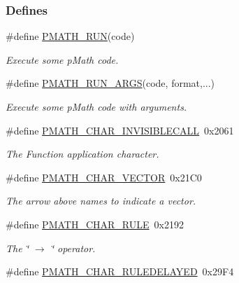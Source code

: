 \subsubsection*{Defines}
\begin{CompactItemize}
\item 
\#define \hyperlink{group__parser_gf8ba5467c4b9e3e32ad0a8606466cb83}{PMATH\_\-RUN}(code)
\begin{CompactList}\small\item\em Execute some pMath code. \item\end{CompactList}\item 
\#define \hyperlink{group__parser_g34e88a07b31df0c7556eb9181dfaca31}{PMATH\_\-RUN\_\-ARGS}(code, format,...)
\begin{CompactList}\small\item\em Execute some pMath code with arguments. \item\end{CompactList}\item 
\hypertarget{group__parser_gc196223b7e2a8e3bd40edb74d6a89ff5}{
\#define \hyperlink{group__parser_gc196223b7e2a8e3bd40edb74d6a89ff5}{PMATH\_\-CHAR\_\-INVISIBLECALL}~0x2061}
\label{group__parser_gc196223b7e2a8e3bd40edb74d6a89ff5}

\begin{CompactList}\small\item\em The Function application character. \item\end{CompactList}\item 
\hypertarget{group__parser_gd074452b9e2d5b34ea47f14789b1c970}{
\#define \hyperlink{group__parser_gd074452b9e2d5b34ea47f14789b1c970}{PMATH\_\-CHAR\_\-VECTOR}~0x21C0}
\label{group__parser_gd074452b9e2d5b34ea47f14789b1c970}

\begin{CompactList}\small\item\em The arrow above names to indicate a vector. \item\end{CompactList}\item 
\hypertarget{group__parser_g405763a689d7919537b7f8c5ac6cf1d3}{
\#define \hyperlink{group__parser_g405763a689d7919537b7f8c5ac6cf1d3}{PMATH\_\-CHAR\_\-RULE}~0x2192}
\label{group__parser_g405763a689d7919537b7f8c5ac6cf1d3}

\begin{CompactList}\small\item\em The \char`\"{} $\rightarrow$ \char`\"{} operator. \item\end{CompactList}\item 
\hypertarget{group__parser_g068e985a2ec2cc2c1db460be979f2610}{
\#define \hyperlink{group__parser_g068e985a2ec2cc2c1db460be979f2610}{PMATH\_\-CHAR\_\-RULEDELAYED}~0x29F4}
\label{group__parser_g068e985a2ec2cc2c1db460be979f2610}


\end{CompactItemize}
